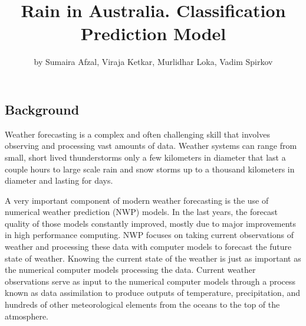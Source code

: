 \title{Rain in Australia. Classification Prediction Model}
\author{by Sumaira Afzal, Viraja Ketkar, Murlidhar Loka, Vadim Spirkov}

\maketitle



\hypertarget{background}{%
\subsection{Background}\label{background}}

Weather forecasting is a complex and often challenging skill that
involves observing and processing vast amounts of data. Weather systems
can range from small, short lived thunderstorms only a few kilometers in
diameter that last a couple hours to large scale rain and snow storms up
to a thousand kilometers in diameter and lasting for days.

A very important component of modern weather forecasting is the use of
numerical weather prediction (NWP) models. In the last years, the
forecast quality of those models constantly improved, mostly due to
major improvements in high performance computing. NWP focuses on taking
current observations of weather and processing these data with computer
models to forecast the future state of weather. Knowing the current
state of the weather is just as important as the numerical computer
models processing the data. Current weather observations serve as input
to the numerical computer models through a process known as data
assimilation to produce outputs of temperature, precipitation, and
hundreds of other meteorological elements from the oceans to the top of
the atmosphere.

